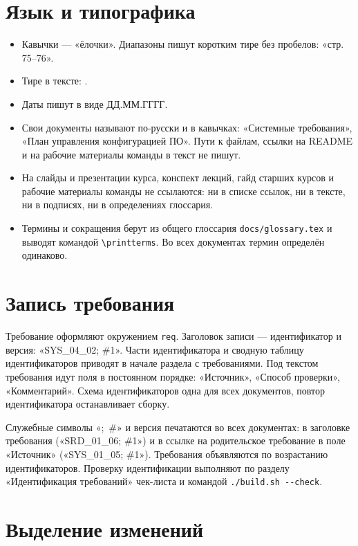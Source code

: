 \documentclass{tpks}
\begin{document}
\section{Язык и типографика}

\begin{itemize}
  \item Кавычки — «ёлочки». Диапазоны пишут коротким тире без пробелов: «стр. 75--76».
  \item Тире в тексте: .
  \item Даты пишут в виде ДД.ММ.ГГГГ.
  \item Свои документы называют по-русски и в кавычках: «Системные требования», «План управления конфигурацией ПО». Пути к файлам, ссылки на README и на рабочие материалы команды в текст не пишут.
  \item На слайды и презентации курса, конспект лекций, гайд старших курсов и рабочие материалы команды не ссылаются: ни в списке ссылок, ни в тексте, ни в подписях, ни в определениях глоссария.
  \item Термины и сокращения берут из общего глоссария \texttt{docs/glossary.tex} и выводят командой \texttt{\textbackslash printterms}. Во всех документах термин определён одинаково.
\end{itemize}

\section{Запись требования}

Требование оформляют окружением \texttt{req}. Заголовок записи — идентификатор и версия: «SYS\_04\_02; \#1». Части идентификатора и сводную таблицу идентификаторов приводят в начале раздела с требованиями. Под текстом требования идут поля в постоянном порядке: «Источник», «Способ проверки», «Комментарий». Схема идентификаторов одна для всех документов, повтор идентификатора останавливает сборку.

Служебные символы «;~\#» и версия печатаются во всех документах: в заголовке требования («SRD\_01\_06; \#1») и в ссылке на родительское требование в поле «Источник» («SYS\_01\_05; \#1»). Требования объявляются по возрастанию идентификаторов. Проверку идентификации выполняют по разделу «Идентификация требований» чек-листа и командой \texttt{./build.sh -{}-check}.

\section{Выделение изменений}\label{sec:changes}
\end{document}
